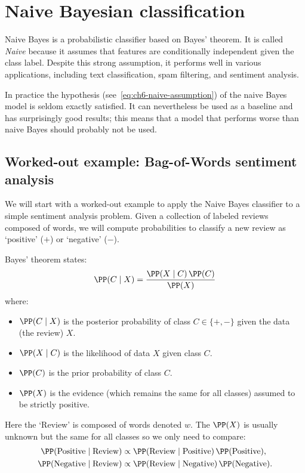 \chapter{Naive Bayesian classification}
\label{chap:naive-bayes}

Naive Bayes is a probabilistic classifier based on Bayes' theorem. It is called
\emph{Naive} because it assumes that features are conditionally independent given
the class label. Despite this strong assumption, it performs well in various
applications, including text classification, spam filtering, and sentiment
analysis.

\begin{warning}
In practice the hypothesis (see~\eqref{eq:ch6-naive-assumption}) of the naive
Bayes model is seldom exactly satisfied. It can nevertheless be used as a
baseline and has surprisingly good results; this means that a model that
performs worse than naive Bayes should probably not be used.
\end{warning}

\section{Worked-out example: Bag-of-Words sentiment analysis}
\label{sec:ch6-bow-example}

We will start with a worked-out example to apply the Naive Bayes classifier
to a simple sentiment analysis problem. Given a collection of labeled reviews
composed of words, we will compute probabilities to classify a new review as
`positive' ($+$) or `negative' ($-$).

Bayes' theorem states:
\begin{equation}\label{eq:ch6-bayes}
  \PP(C\mid X)=\frac{\PP(X\mid C)\,\PP(C)}{\PP(X)}
\end{equation}
where:
\begin{itemize}
  \item $\PP(C\mid X)$ is the posterior probability of class
        $C\in\{+,-\}$ given the data (the review) $X$.
  \item $\PP(X\mid C)$ is the likelihood of data $X$ given class $C$.
  \item $\PP(C)$ is the prior probability of class $C$.
  \item $\PP(X)$ is the evidence (which remains the same for all classes)
        assumed to be strictly positive.
\end{itemize}

Here the `Review' is composed of words denoted $w$. The $\PP(X)$ is usually
unknown but the same for all classes so we only need to compare:
\begin{align}
  \PP(\text{Positive}\mid\text{Review})
    &\propto \PP(\text{Review}\mid\text{Positive})\,\PP(\text{Positive}),
      \label{eq:ch6-prop-pos}\\
  \PP(\text{Negative}\mid\text{Review})
    &\propto \PP(\text{Review}\mid\text{Negative})\,\PP(\text{Negative}).
      \label{eq:ch6-prop-neg}
\end{align}

